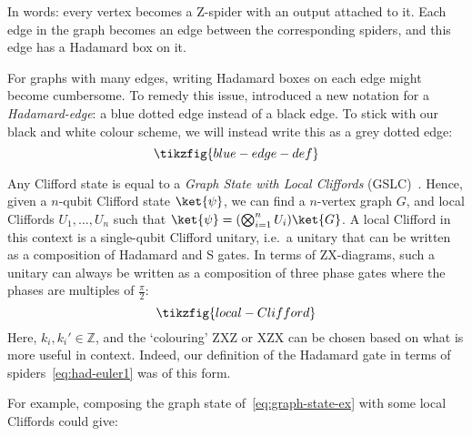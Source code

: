 \documentclass[a4paper,onecolumn,superscriptaddress,11pt,%
				unpublished,%
				allowfontchageintitle,%
				]{quantumarticle}
\begin{document}
In words: every vertex becomes a Z-spider with an output attached to it. Each edge in the graph becomes an edge between the corresponding spiders, and this edge has a Hadamard box on it.

For graphs with many edges, writing Hadamard boxes on each edge might become cumbersome. To remedy this issue, \cite{cliffsimp} introduced a new notation for a \emph{Hadamard-edge}: a blue dotted edge instead of a black edge. To stick with our black and white colour scheme, we will instead write this as a grey dotted edge:
\begin{equation}\label{eq:def-had-edge}
\tikzfig{blue-edge-def}
\end{equation}

Any Clifford state is equal to a \emph{Graph State with Local Cliffords} (GSLC)~\cite{vandennest2004graphical}. Hence, given a $n$-qubit Clifford state $\ket{\psi}$, we can find a $n$-vertex graph $G$, and local Cliffords $U_1,\ldots, U_n$ such that $\ket{\psi} = (\bigotimes_{i=1}^n U_i) \ket{G}$.
A local Clifford in this context is a single-qubit Clifford unitary, i.e.~a unitary that can be written as a composition of Hadamard and S gates. In terms of ZX-diagrams, such a unitary can always be written as a composition of three phase gates where the phases are multiples of $\frac\pi2$:
\begin{equation}
\tikzfig{local-Clifford}
\end{equation}
Here, $k_i,k_i'\in \mathbb{Z}$, and the `colouring' ZXZ or XZX can be chosen based on what is more useful in context.
Indeed, our definition of the Hadamard gate in terms of spiders~\eqref{eq:had-euler1} was of this form.

For example, composing the graph state of~\eqref{eq:graph-state-ex} with some local Cliffords could give:
\end{document}

